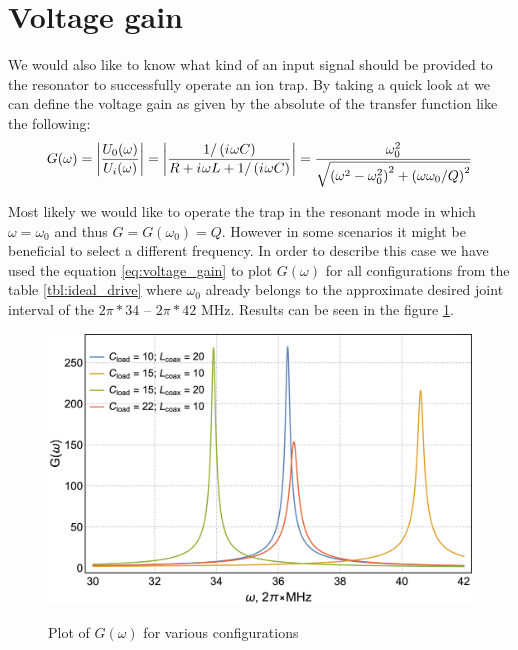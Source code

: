 \section{Voltage gain}

We would also like to know what kind of an input signal should be provided to the resonator to successfully operate an ion trap. By taking a quick look at \cite{Leupold2015} we can define the voltage gain as given by the absolute of the transfer function like the following:
\begin{equation}
	G(\omega) = \left| \frac{U_0(\omega)}{U_i(\omega)} \right| = \left | \frac{1/\left( {i\mkern1mu} \omega C \right)}{R + {i\mkern1mu} \omega L + 1/\left( {i\mkern1mu} \omega C \right)} \right| = \frac{\omega_0^2}{\sqrt{\left( \omega^2 - \omega_0^2 \right)^2 + \left( \omega \omega_0 / Q\right)^2}}
	\label{eq:voltage_gain}
\end{equation}

Most likely we would like to operate the trap in the resonant mode in which $\omega = \omega_0$ and thus $G = G(\omega_0) = Q$. However in some scenarios it might be beneficial to select a different frequency. In order to describe this case we have used the equation \ref{eq:voltage_gain} to plot $G(\omega)$ for all configurations from the table \ref{tbl:ideal_drive} where $\omega_0$ already belongs to the approximate desired joint interval of the $2\pi*34$ -- $2\pi*42$ MHz. Results can be seen in the figure \ref{fig:G(w)_plot}.
\begin{figure}[h]
\centering
\includegraphics[width=\textwidth]{images/G(w)_plot}
\label{fig:G(w)_plot}
\caption{Plot of $G(\omega)$ for various configurations}
\end{figure}